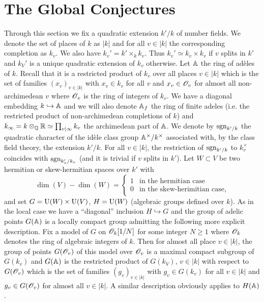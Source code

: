 \section{The Global Conjectures}


Through this section we fix a quadratic extension $k'/k$ of number fields.
We denote the set of places of $k$ as $|k|$ and for all $v \in |k|$ the corresponding completion as $k_v$.
We also have $k_v' = k' \times_k k_v$.
Thus $k_v' \simeq k_v \times k_v$ if $v$ splits in $k'$ and $k_V'$ is a unique quadratic extension of $k_v$ otherwise.
Let $\mathbb{A}$ the ring of ad\`eles of $k$.
Recall that it is a restricted product of $k_v$ over all places $v \in |k|$ which is the set of families $(x_v)_{v\in |k|}$ with $x_v \in k_v$ for all $v$ and $x_v \in \mathscr{O}_v$ for almost all non-archimedean $v$ where $\mathscr{O}_v$ is the ring of integers of $k_v$.
We have a diagonal embedding $k \hookrightarrow \mathbb{A}$ and we will also denote $\mathbb{A}_f$ the ring of finite adeles (i.e. the restricted product of non-archimedean completions of $k$) and $k_\infty = k \otimes_{\mathbb{Q}} \mathbb{R} \simeq \prod_{v|\infty}k_v$ the archimedean part of $\mathbb{A}$.
We denote by $\mathrm{sgn}_{k'/k}$ the quadratic character of the id\`ele class group $\mathbb{A}^\times / k^\times$ associated with, by the class field theory, the extension $k'/k$.
For all $v \in |k|$, the restriction of $\mathrm{sgn}_{k'/k}$ to $k_v^\times$ coincides with $\mathrm{sgn}_{k_v'/k_v}$ (and it is trivial if $v$ splits in $k'$).
Let $W \subset V$ be two hermitian or skew-hermitian spaces over $k'$ with
\[
    \dim(V) - \dim(W) = \begin{cases} 1 & \text{in the hermitian case} \\ 0 & \text{in the skew-herimitian case},
    \end{cases}
\]
and set $G = \mathrm{U}(W) \times \mathrm{U}(V)$, $H = \mathrm{U}(W)$ (algebraic groups defined over $k$).
As in the local case we have a ``diagonal'' inclusion $H \hookrightarrow G$ and the group of adelic points $G(\mathbb{A})$ is a locally compact group admitting the following more explicit description.
Fix a model of $G$ on $\mathscr{O}_k[1/N]$ for some integer $N \geq 1$ where $\mathscr{O}_k$ denotes the ring of algebraic integers of $k$.
Then for almost all place $v \in |k|$, the group of points $G(\mathscr{O}_v)$ of this model over $\mathscr{O}_v$ is a maximal compact subgroup of $G(k_v)$ and $G(\mathbb{A})$ is the restricted product of $G(k_V)$, $v \in |k|$ with respect to $G(\mathscr{O}_v)$ which is the set of families $(g_v)_{v \in |k|}$ with $g_v \in G(k_v)$ for all $v \in |k|$ and $g_v \in G(\mathscr{O}_v)$ for almost all $v \in |k|$.
A similar description obviously applies to $H(\mathbb{A})$.


